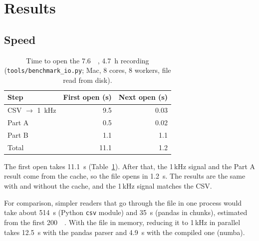 \section{Results}

\subsection{Speed}
\begin{table}[H]
  \centering
  \caption{Time to open the \SI{7.6}{\giga\byte}, \SI{4.7}{\hour} recording
           (\texttt{tools/benchmark\_io.py}; Mac, 8 cores, 8 workers, file read from disk).}
  \label{tab:speed}
  \begin{tabular}{lrr}
    \toprule
    Step & First open (s) & Next open (s) \\
    \midrule
    CSV $\rightarrow$ \SI{1}{\kilo\hertz} & 9.5 & 0.03 \\
    Part A & 0.5 & 0.02 \\
    Part B & 1.1 & 1.1 \\
    \midrule
    Total & 11.1 & 1.2 \\
    \bottomrule
  \end{tabular}
\end{table}
The first open takes \SI{11.1}{\second} (Table~\ref{tab:speed}). After that, the 1\,kHz signal and the Part A result
come from the cache, so the file opens in \SI{1.2}{\second}. The results are the same with and
without the cache, and the 1\,kHz signal matches the CSV.

For comparison, simpler readers that go through the file in one process would take about
\SI{514}{\second} (Python \texttt{csv} module) and \SI{35}{\second} (pandas in chunks),
estimated from the first \SI{200}{\mega\byte}. With the file in memory, reducing it to 1\,kHz in
parallel takes \SI{12.5}{\second} with the pandas parser and \SI{4.9}{\second} with the compiled one (numba).






